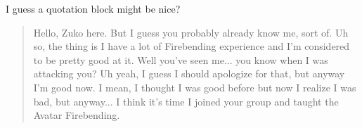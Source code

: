 \documentclass[
reprint,
amsmath,amssymb,showpacs,
aps,citeautoscript,prb,
onecolumn,notitlepage
]{revtex4-1}
\begin{document}
I guess a quotation block might be nice?

\begin{quotation}
Hello, Zuko here. But I guess you probably already know me, sort of. Uh so, the thing is I have a lot of Firebending experience and I'm considered to be pretty good at it. Well you've seen me... you know when I was attacking you? Uh yeah, I guess I should apologize for that, but anyway I'm good now. I mean, I thought I was good before but now I realize I was bad, but anyway... I think it's time I joined your group and taught the Avatar Firebending.
\end{quotation}

\nocite{*}
\end{document}

